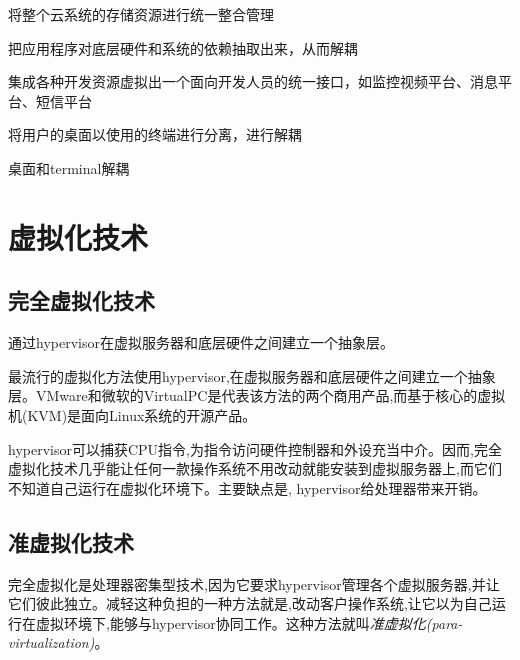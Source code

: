 \begin{definition}[存储虚拟化]
    将整个云系统的存储资源进行统一整合管理
\end{definition}

\begin{definition}[应用程序虚拟化]
    把应用程序对底层硬件和系统的依赖抽取出来，从而解耦
\end{definition}

\begin{definition}[平台虚拟化]
    集成各种开发资源虚拟出一个面向开发人员的统一接口，如监控视频平台、消息平台、短信平台
\end{definition}

\begin{definition}[桌面虚拟化]
    将用户的桌面以使用的终端进行分离，进行解耦

    桌面和terminal解耦
\end{definition}

\section{虚拟化技术}


\subsection{完全虚拟化技术}

\begin{definition}[完全虚拟化技术]
    通过hypervisor在虚拟服务器和底层硬件之间建立一个抽象层。
\end{definition}

最流行的虚拟化方法使用hypervisor,在虚拟服务器和底层硬件之间建立一个抽象层。VMware和微软的VirtualPC是代表该方法的两个商用产品,而基于核心的虚拟机(KVM)是面向Linux系统的开源产品。

hypervisor可以捕获CPU指令,为指令访问硬件控制器和外设充当中介。因而,完全虚拟化技术几乎能让任何一款操作系统不用改动就能安装到虚拟服务器上,而它们不知道自己运行在虚拟化环境下。主要缺点是, hypervisor给处理器带来开销。


\subsection{准虚拟化技术}

\begin{definition}[准虚拟化技术]
    完全虚拟化是处理器密集型技术,因为它要求hypervisor管理各个虚拟服务器,并让它们彼此独立。减轻这种负担的一种方法就是,改动客户操作系统,让它以为自己运行在虚拟环境下,能够与hypervisor协同工作。这种方法就叫\textit{准虚拟化(para-virtualization)}。
\end{definition}

